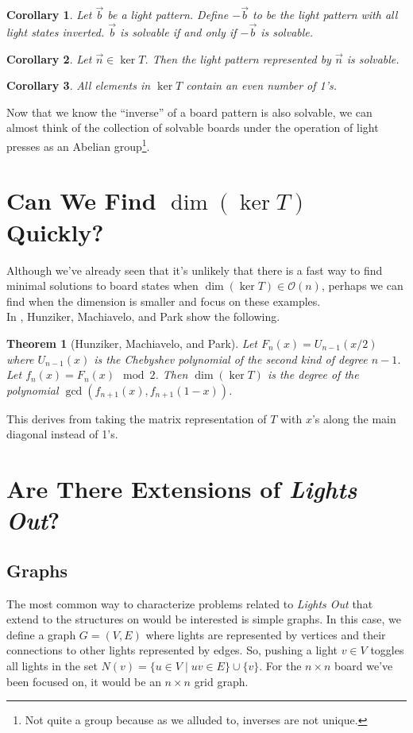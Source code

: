 \documentclass[a4paper]{article}
\renewcommand{\O}{\mathcal{O}}
\newtheorem*{theorem}{Theorem}
\newtheorem*{corollary}{Corollary}
\begin{document}
	\begin{corollary}
		Let $\vec{b}$ be a light pattern.
		Define $-\vec{b}$ to be the light pattern with all light states inverted.
		$\vec{b}$ is solvable if and only if $-\vec{b}$ is solvable.
	\end{corollary}
	\begin{corollary}
		Let $\vec{n} \in \ker{T}$.
		Then the light pattern represented by $\vec{n}$ is solvable.
	\end{corollary}
	\begin{corollary}
		All elements in $\ker{T}$ contain an even number of 1's.
	\end{corollary}

	Now that we know the ``inverse'' of a board pattern is also solvable, we can almost think of the collection of solvable boards under the operation of light presses as an Abelian group\footnote{Not quite a group because as we alluded to, inverses are not unique.}.

	\section{Can We Find $\dim{(\ker{T})}$ Quickly?}
	Although we've already seen that it's unlikely that there is a fast way to find minimal solutions to board states when $\dim{(\ker T)} \in \O(n)$, perhaps we can find when the dimension is smaller and focus on these examples. \\
	
	In \cite{HUNZIKER2004465}, Hunziker, Machiavelo, and Park show the following.
	\begin{theorem}[Hunziker, Machiavelo, and Park]
		Let $F_n(x) = U_{n-1}(x/2)$ where $U_{n-1}(x)$ is the Chebyshev polynomial of the second kind of degree $n-1$.
		Let $f_n(x) = F_n(x) \mod 2$.
		Then $\dim{(\ker T)}$ is the degree of the polynomial $\gcd{(f_{n+1}(x),f_{n+1}(1-x))}$.
	\end{theorem}
	This derives from taking the matrix representation of $T$ with $x$'s along the main diagonal instead of 1's.
	
	\section{Are There Extensions of \textit{Lights Out}?}
	\subsection{Graphs}
	The most common way to characterize problems related to \textit{Lights Out} that extend to the structures on would be interested is simple graphs.
	In this case, we define a graph $G = (V,E)$ where lights are represented by vertices and their connections to other lights represented by edges.
	So, pushing a light $v \in V$ toggles all lights in the set $N(v) = \{u \in V \mid uv \in E\} \cup \{v\}$.
	For the $n \times n$ board we've been focused on, it would be an $n \times n$ grid graph.
	
\end{document}
